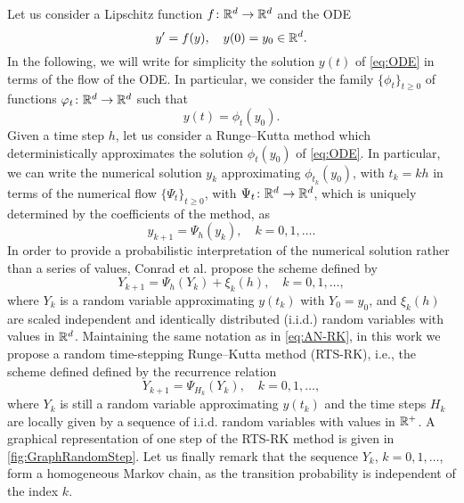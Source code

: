 \documentclass[10pt]{article}
\begin{document}
Let us consider a Lipschitz function $f\colon\mathbb{R}^d\to\mathbb{R}^d$ and the ODE
\begin{equation}\label{eq:ODE}
	y' = f(y), \quad y(0) = y_0 \in \mathbb{R}^d.
\end{equation}
In the following, we will write for simplicity the solution $y(t)$ of \eqref{eq:ODE} in terms of the flow of the ODE. In particular, we consider the family  $\{\phi_t\}_{t \geq 0}$ of functions $\varphi_t\colon\mathbb{R}^d\to\mathbb{R}^d$ such that 
\begin{equation}
	y(t) = \phi_t(y_0).
\end{equation}
Given a time step $h$, let us consider a Runge--Kutta method which deterministically approximates the solution $\phi_t(y_0)$ of \eqref{eq:ODE}. In particular, we can write the numerical solution $y_k$ approximating $\phi_{t_k}(y_0)$, with $t_k = kh$ in terms of the numerical flow $\{\Psi_t\}_{t \geq 0}$, with $\Psi_t\colon\mathbb{R}^d\to\mathbb{R}^d$, which is uniquely determined by the coefficients of the method, as
\begin{equation}
	y_{k+1} = \Psi_h(y_k), \quad k = 0, 1, \ldots.
\end{equation}
In order to provide a probabilistic interpretation of the numerical solution rather than a series of  values, Conrad et al. propose the scheme defined by
\begin{equation}\label{eq:AN-RK}
	Y_{k+1} = \Psi_h(Y_{k}) + \xi_k(h), \quad k = 0, 1, \ldots,
\end{equation}
where $Y_k$ is a random variable approximating $y(t_k)$ with $Y_0 = y_0$, and $\xi_k(h)$ are  scaled independent and identically distributed (i.i.d.) random variables with values in $\mathbb{R}^d$. Maintaining the same notation as in \eqref{eq:AN-RK}, in this work we propose a random time-stepping Runge--Kutta method (RTS-RK), i.e., the scheme defined defined by the recurrence relation
\begin{equation}\label{eq:RTS-RK}
	Y_{k+1} = \Psi_{H_k}(Y_k), \quad k = 0, 1, \ldots,
\end{equation}
where $Y_k$ is still a random variable approximating $y(t_k)$ and the time steps $H_k$ are locally given by a sequence  of i.i.d. random variables with values in $\mathbb{R}^+$. A graphical representation of one step of the RTS-RK method is given in \cref{fig:GraphRandomStep}. Let us finally remark that the sequence $Y_k$, $k = 0, 1, \ldots$, form a homogeneous Markov chain, as the transition probability is independent of the index $k$.
\end{document}
